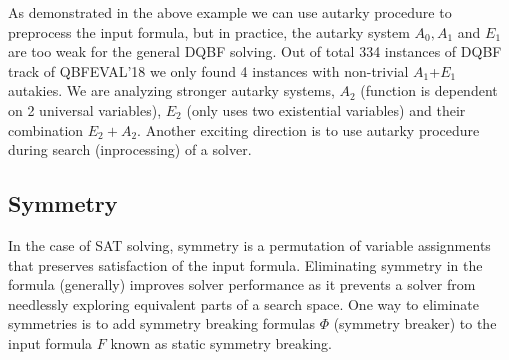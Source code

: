 \documentclass[conference]{IEEEtran}
\begin{document}
As demonstrated in the above example we can use autarky procedure to preprocess the input formula, but in practice, the autarky system $A_0, A_1$ and $E_1$ are too weak for the general DQBF solving. Out of total 334 instances of DQBF track of QBFEVAL'18 we only found 4 instances with non-trivial $A_1$+$E_1$ autakies. We are analyzing stronger autarky systems, $A_2$ (function is dependent on 2 universal variables), $E_2$ (only uses two existential variables) and their combination $E_2 + A_2$. 
%
Another exciting direction is to use autarky procedure during search (inprocessing) of a solver. 

\subsection{Symmetry}
\label{sec:sym}

%
In the case of SAT solving, symmetry is a permutation of variable assignments that preserves satisfaction of the input formula.
%
Eliminating symmetry in the formula (generally) improves solver performance as it prevents a solver from needlessly exploring equivalent parts of a search space.
%
One way to eliminate symmetries is to add symmetry breaking formulas $\Phi$ (symmetry breaker) to the input formula $F$ known as static symmetry breaking.
% 
%
%
%
%
\end{document}
